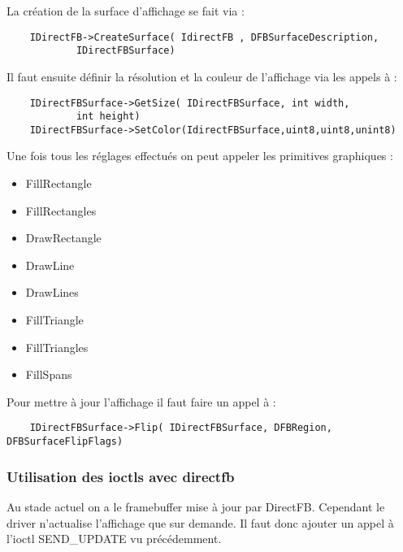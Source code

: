 La création de la surface d'affichage se fait via : 
	\begin{lstlisting}
	IDirectFB->CreateSurface( IdirectFB , DFBSurfaceDescription, 
			IDirectFBSurface)
	\end{lstlisting}

Il faut ensuite définir la résolution et la couleur de l'affichage via les appels à :
	\begin{lstlisting}
	IDirectFBSurface->GetSize( IDirectFBSurface, int width, 
			int height)
	IDirectFBSurface->SetColor(IdirectFBSurface,uint8,uint8,unint8)
	\end{lstlisting}

Une fois tous les réglages effectués on peut appeler les primitives graphiques : 
\begin{itemize}
	\item FillRectangle
	\item FillRectangles
	\item DrawRectangle
	\item DrawLine
	\item DrawLines
	\item FillTriangle
	\item FillTriangles
	\item FillSpans
\end{itemize}

Pour mettre à jour l'affichage il faut faire un appel à : 
	\begin{lstlisting}
	IDirectFBSurface->Flip( IDirectFBSurface, DFBRegion, DFBSurfaceFlipFlags)
	\end{lstlisting}




\subsubsection{Utilisation des ioctls avec directfb}

Au stade actuel on a le framebuffer mise à jour par DirectFB. Cependant le driver n'actualise l'affichage que sur demande.
Il faut donc ajouter un appel à l'ioctl SEND_UPDATE vu précédemment.

